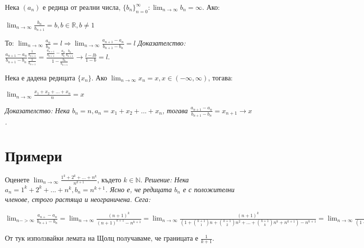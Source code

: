 \documentclass[12pt]{article}
\begin{document}
\begin{theorem}

Нека \((a_n)\) е редица от реални числа, \(\displaystyle\{b_n\}_{n=0}^\infty: \lim_{n \to \infty} b_n = \infty\). Ако:
\begin{center}
\(
    \displaystyle\lim_{n \to \infty}\frac{b_n}{b_{n+1}} = b, b \in \mathbb R, b \neq 1
\)
\end{center}
То: \(\displaystyle\lim_{n \to \infty}\frac{a_n}{b_n} = l \Rightarrow \lim_{n \to \infty}\frac{a_{n+1} - a_n}{b_{n+1} - b_n} = l \)
\newline
\it{Доказателство:}
\(
    \displaystyle\frac{a_{n + 1} - a_n}{b_{n+1} - b_n} \frac{\frac{1}{b_{n+1}}}{\frac{1}{b_{n+1}}} = \frac{\frac{a_{n+1}}{b_{n+1}} - \frac{a_n}{b_n}\frac{b_n}{b_{n+1}}}{1 - \frac{b_n}{b_{n+1}}}
    \to
    \frac{l - lb}{1 - b} = l.
\)
\end{theorem}

\begin{theorem}
Нека е дадена редицата \(\{x_n\}\). Ако \(\displaystyle\lim_{n \to \infty} x_n = x, x \in (-\infty, \infty)\), тогава:
\begin{center}
\(
    \displaystyle\lim_{n \to \infty} \frac{x_1 + x_2 + ... + x_n}{n} = x
\)
\end{center}
\it{Доказателство:} Нека \(b_n = n, a_n = x_1 + x_2 + ... + x_n\), тогава \(\displaystyle\frac{a_{n+1} - a_n}{b_{n+1} - b_n} = x_{n+1} \to x\).
\end{theorem}

\newpage
\section{Примери}

\begin{example}
Оценете \(\displaystyle\lim_{n \to \infty} \frac{1^k + 2^k + ... + n^k}{n^{k+1}}\), където \(k \in \mathbb N\).
\newline
\it{Решение:} Нека \(a_n = 1^k + 2^k + ... + n^k, b_n = n^{k+1}\). Ясно е, че редицата \(b_n\) е с положителни членове, строго растяща и неограничена. Сега:
\begin{center}
\(
    \displaystyle\lim_{n->\infty}\frac{a_{n+} - a_n}{b_{n+1} - b_n} = \lim_{n \to \infty}\frac{(n + 1)^k}{(n + 1)^{k+1} - n^{k+1}} = 
    \lim_{n \to \infty}\frac{(n + 1)^k}{(1 + \binom{k+1}{1}n + \binom{k + 1}{2}n^2+ ... + \binom{k + 1}{k}n^k + n^{k + 1}) - n^{k + 1}} = 
    \lim_{n \to \infty}\frac{(n + 1)^k/n^k}{(1 + \binom{k + 1}{1}n + \binom{k + 1}{2}n^2 + ... + \binom{k + 1}{k}n^k)/n^k} =
    \lim_{n \to \infty}\frac{(1 + 1 / n)^k}{\binom{k + 1}{k}} = \frac{1}{k + 1}.
\)
\end{center}
От тук използвайки лемата на Щолц получаваме, че границата е \(\frac{1}{k + 1}\).
\end{example}
\end{document}
